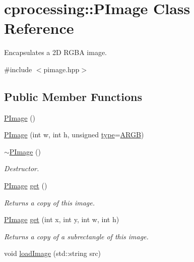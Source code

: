 \hypertarget{classcprocessing_1_1PImage}{\section{cprocessing\-:\-:\-P\-Image \-Class \-Reference}
\label{classcprocessing_1_1PImage}
}


\-Encapsulates a 2\-D \-R\-G\-B\-A image.  




{\ttfamily \#include $<$pimage.\-hpp$>$}

\subsection*{\-Public \-Member \-Functions}
\begin{DoxyCompactItemize}
\item 
\hyperlink{classcprocessing_1_1PImage_aea096595674c7814173d5903a162819b}{\-P\-Image} ()
\item 
\hyperlink{classcprocessing_1_1PImage_a1f6044cb12652ef38120e8a1cd087631}{\-P\-Image} (int w, int h, unsigned \hyperlink{classcprocessing_1_1PImage_a465d1a7c776bc7735cc5bdb4dca20586}{type}=\hyperlink{namespacecprocessing_a9b569822741b2c00fca52ba8514a19f3af1455f1c4fd332b7146ef56c8a64b0df}{\-A\-R\-G\-B})
\item 
\hyperlink{classcprocessing_1_1PImage_ab816b49726026c86174a82ed5afb4ad0}{$\sim$\-P\-Image} ()
\begin{DoxyCompactList}\small\item\em \-Destructor. \end{DoxyCompactList}\item 
\hyperlink{classcprocessing_1_1PImage}{\-P\-Image} \hyperlink{classcprocessing_1_1PImage_a2b317924f150f4afbc0b07273746abf9}{get} ()
\begin{DoxyCompactList}\small\item\em \-Returns a copy of this image. \end{DoxyCompactList}\item 
\hyperlink{classcprocessing_1_1PImage}{\-P\-Image} \hyperlink{classcprocessing_1_1PImage_a38c5bc861ab4999e9b71367e45ab2fc0}{get} (int x, int y, int w, int h)
\begin{DoxyCompactList}\small\item\em \-Returns a copy of a subrectangle of this image. \end{DoxyCompactList}\item 
void \hyperlink{classcprocessing_1_1PImage_af890772e2644313f266f32ee322e52c2}{load\-Image} (std\-::string src)

\end{DoxyCompactItemize}
